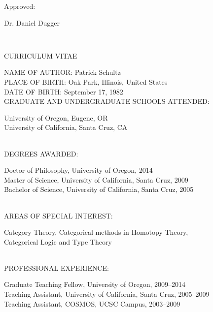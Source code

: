 \documentclass[11pt,draft]{UOthesis}
\begin{document}
	{\singlespace
	Approved: \parbox[t]{3.51in}{
	\underline{\hspace*{3.5in}}
	\centerline{Dr. Daniel Dugger} %
	}} \\[9pt]

	\setlength{\parindent}{.5in} 


	\setlength{\parindent}{0in} 


\newpage

\TOP
\centerline{CURRICULUM VITAE}
{\singlespacing
NAME OF AUTHOR: Patrick Schultz  \\[12pt]

PLACE OF BIRTH: Oak Park, Illinois, United States\\[12pt]

DATE OF BIRTH: September 17, 1982 \\[12pt]

GRADUATE AND UNDERGRADUATE SCHOOLS ATTENDED: \\[6pt]

 \hspace*{.5in}
\parbox[t]{5.5in}{
University of Oregon, Eugene, OR\\
University of California, Santa Cruz, CA
}\\[24pt]

DEGREES AWARDED: \\[6pt]

\hspace*{.5in}
\parbox[t]{5.5in}{
Doctor of Philosophy, University of Oregon, 2014 \\
Master of Science, University of California, Santa Cruz, 2009\\
Bachelor of Science, University of California, Santa Cruz, 2005
}\\[24pt]

AREAS OF SPECIAL INTEREST: \\[6pt]

\hspace*{.5in}
\parbox[t]{5.5in}{
\setlength{\hangindent}{.3in}
Category Theory, Categorical methods in Homotopy Theory,\\
Categorical Logic and Type Theory
} \\[24pt]

PROFESSIONAL EXPERIENCE: \\[6pt]

\hspace*{.5in}
\parbox[t]{5.5in}{
Graduate Teaching Fellow, University of Oregon, 2009--2014\\
Teaching Assistant, University of California, Santa Cruz, 2005--2009\\
Teaching Assistant, COSMOS, UCSC Campus, 2003--2009
} \\[6pt]


}
\end{document}
